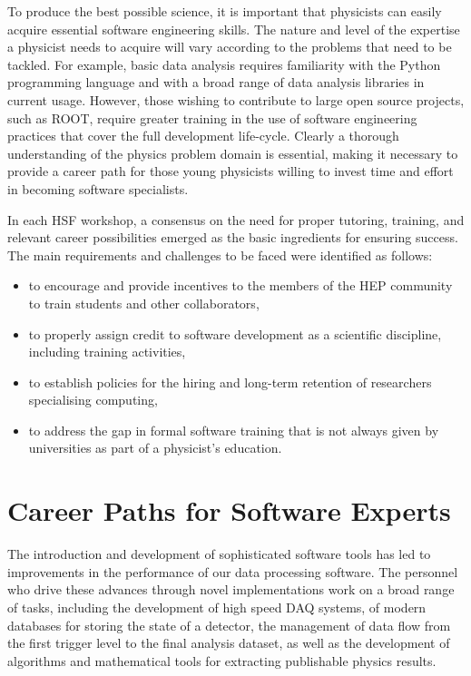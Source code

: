 \documentclass[12pt,a4paper]{article}
\begin{document}
To produce the best possible science, it is important that physicists can easily acquire
essential software engineering skills. The nature and level of the expertise a 
physicist needs to acquire will vary according to the problems that need to be tackled. 
For example, basic data analysis requires familiarity with the Python programming language 
and with a broad range of data analysis libraries in current usage. However, those 
wishing to contribute to large open source projects, such as ROOT, require greater 
training in the use of software engineering practices that cover the full development 
life-cycle. Clearly a thorough understanding of the physics problem domain is  
essential, making it necessary to provide a career path for those
young physicists willing to invest time and effort in becoming software specialists.

In each HSF workshop, a consensus on the need for proper tutoring, training,
and relevant career possibilities emerged as the basic ingredients for ensuring success.
The main requirements and challenges to be faced were identified as follows:

\begin{itemize}
    \item to encourage and provide incentives to the members of the HEP 
    community to train students and other collaborators,
    \item to properly assign credit to software development as a scientific 
    discipline, including training activities,
    \item to establish policies for the hiring and long-term retention of researchers 
    specialising computing,
    \item to address the gap in formal software training that is not always 
    given by universities as part of a physicist's education.
\end{itemize}

\section{Career Paths for Software Experts}


The introduction and development of sophisticated software tools has led to
improvements in the performance of our data processing software. The
personnel who drive these advances through novel implementations work on a broad 
range of tasks, including the development of high speed DAQ systems, of modern databases for
storing the state of a detector, the management of data flow from the first trigger 
level to the final analysis dataset, as well as the development of algorithms and
mathematical tools for extracting publishable physics results.
\end{document}
